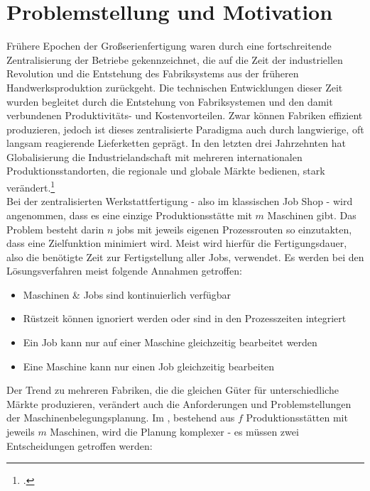 \documentclass[final, english, ngerman, a4paper, 12pt, %
numbers=noenddot,
cd=true,
cdfont=false,cdfont=nohead,cdfont=nodin,
cdmath=false,
cdhead=false,
cdfoot=true,
cdcover=monochrome,
cdgeometry=symmetric,
declaration=heading,
declaration=notoc,
abstract=heading,
]{tudscrreprt}
\begin{document}
\chapter{Problemstellung und Motivation}

Frühere Epochen der Großserienfertigung waren durch eine fortschreitende Zentralisierung der Betriebe gekennzeichnet, die auf die Zeit der industriellen Revolution und die Entstehung des Fabriksystems aus der früheren Handwerksproduktion zurückgeht. Die technischen Entwicklungen dieser Zeit wurden begleitet durch die Entstehung von Fabriksystemen und den damit verbundenen Produktivitäts- und Kostenvorteilen. Zwar können Fabriken effizient produzieren, jedoch ist dieses zentralisierte Paradigma auch durch langwierige, oft langsam reagierende Lieferketten geprägt. In den letzten drei Jahrzehnten hat Globalisierung die Industrielandschaft mit mehreren internationalen Produktionsstandorten, die regionale und globale Märkte bedienen, stark verändert.\footcite[Vgl.][S. 135f]{babbage-economy} \\

\noindent
Bei der zentralisierten Werkstattfertigung - also im klassischen Job Shop - wird angenommen, dass es eine einzige Produktionsstätte mit $m$ Maschinen gibt. Das Problem besteht darin $n$ jobs mit jeweils eigenen Prozessrouten so einzutakten, dass eine Zielfunktion minimiert wird. Meist wird hierfür die Fertigungsdauer, also die benötigte Zeit zur Fertigstellung aller Jobs, verwendet. Es werden bei den Lösungsverfahren meist folgende Annahmen getroffen:

\begin{itemize}
	\item Maschinen \& Jobs sind kontinuierlich verfügbar
	\item Rüstzeit können ignoriert werden oder sind in den Prozesszeiten integriert
	\item Ein Job kann nur auf einer Maschine gleichzeitig bearbeitet werden
	\item Eine Maschine kann nur einen Job gleichzeitig bearbeiten
\end{itemize}

\noindent
Der Trend zu mehreren Fabriken, die die gleichen Güter für unterschiedliche Märkte produzieren, verändert auch die Anforderungen und Problemstellungen der Maschinenbelegungsplanung. Im , bestehend aus $f$ Produktionsstätten mit jeweils $m$ Maschinen, wird die Planung komplexer - es müssen zwei Entscheidungen getroffen werden:
\end{document}
